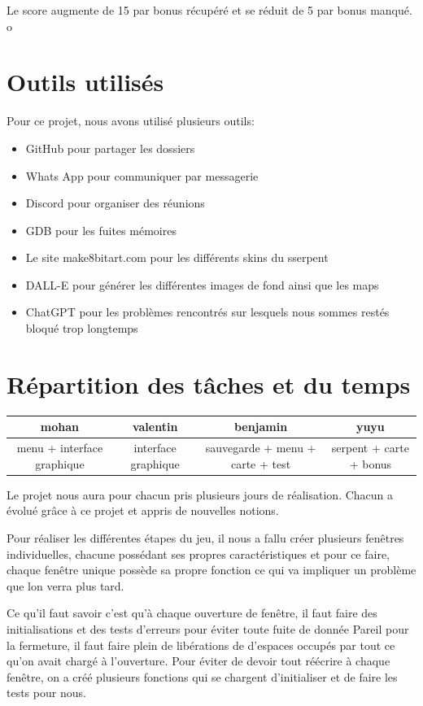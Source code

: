 \documentclass{article}
\begin{document}
Le score augmente de 15 par bonus récupéré et se réduit de 5 par bonus manqué.
\\[1cm]
o\section{Outils utilisés}
Pour ce projet, nous avons utilisé plusieurs outils:
\begin{itemize}
    \item GitHub pour partager les dossiers
    \item Whats App pour communiquer par messagerie
    \item Discord pour organiser des réunions
    \item GDB pour les fuites mémoires
    \item Le site make8bitart.com pour les différents skins du sserpent
    \item DALL-E pour générer les différentes images de fond ainsi que les maps
    \item ChatGPT pour les problèmes rencontrés sur lesquels nous sommes restés bloqué trop longtemps
    
\end{itemize}
\section{Répartition des tâches et du temps}
\begin{center}
    \begin{tabular}{|c|c|c|c|}
    \hline
         mohan&  valentin &benjamin & yuyu\\
    \hline
         menu + interface graphique&interface graphique &sauvegarde + menu + carte + test &serpent + carte + bonus\\
    \hline
    \end{tabular}
\end{center}
Le projet nous aura pour chacun pris plusieurs jours de réalisation. Chacun a évolué grâce à ce projet et appris de nouvelles notions.

Pour réaliser les différentes étapes du jeu, il nous a fallu créer plusieurs fenêtres individuelles, chacune possédant ses propres caractéristiques et pour ce faire, chaque fenêtre unique possède sa propre fonction ce qui va impliquer un problème que lon verra plus tard.

Ce qu’il faut savoir c’est qu’à chaque ouverture de fenêtre, il faut faire des initialisations et des tests d’erreurs pour éviter toute fuite de donnée
Pareil pour la fermeture, il faut faire plein de libérations de d’espaces occupés par tout ce qu’on avait chargé à l’ouverture.
Pour éviter de devoir tout réécrire à chaque fenêtre, on a créé plusieurs fonctions qui se chargent d’initialiser et de faire les tests pour nous.
\end{document}
